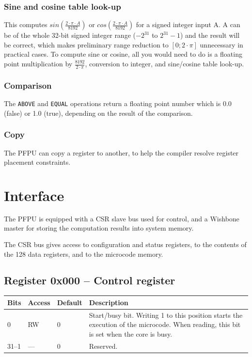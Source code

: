 \documentclass[a4paper,11pt]{article}
\begin{document}
\subsubsection{Sine and cosine table look-up}
This computes $sin(\frac{2 \cdot \pi \cdot A}{8192})$ or $cos(\frac{2 \cdot \pi \cdot A}{8192})$ for a signed integer input A. A can be of the whole 32-bit signed integer range ($-2^{31}$ to $2^{31}-1$) and the result will be correct, which makes preliminary range reduction to $[0;2\cdot\pi]$ unnecessary in practical cases. To compute sine or cosine, all you would need to do is a floating point multiplication by $\frac{8192}{2 \cdot \pi}$, conversion to integer, and sine/cosine table look-up.

\subsubsection{Comparison}
The \verb!ABOVE! and \verb!EQUAL! operations return a floating point number which is 0.0 (false) or 1.0 (true), depending on the result of the comparison.

\subsubsection{Copy}
The PFPU can copy a register to another, to help the compiler resolve register placement constraints.

\section{Interface}
The PFPU is equipped with a CSR slave bus used for control, and a Wishbone master for storing the computation results into system memory.

The CSR bus gives access to configuration and status registers, to the contents of the 128 data registers, and to the microcode memory.

\subsection{Register 0x000 -- Control register}
\begin{tabularx}{\textwidth}{|l|l|l|X|}
\hline
\bf Bits & \bf Access & \bf Default & \bf Description \\
\hline
0 & RW & 0 & Start/busy bit. Writing 1 to this position starts the execution of the microcode. When reading, this bit is set when the core is busy. \\
\hline
31--1 & --- & 0 & Reserved. \\
\hline
\end{tabularx}
\end{document}

